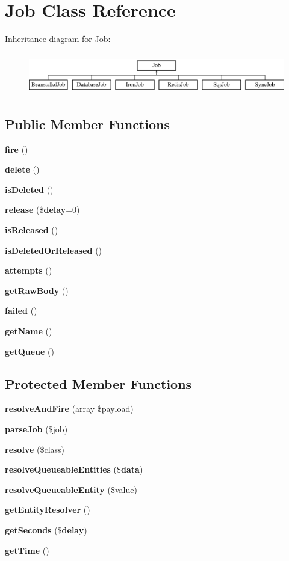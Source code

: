 \section{Job Class Reference}
\label{class_illuminate_1_1_queue_1_1_jobs_1_1_job}
Inheritance diagram for Job\+:\begin{figure}[H]
\begin{center}
\leavevmode
\includegraphics[height=1.830065cm]{class_illuminate_1_1_queue_1_1_jobs_1_1_job}
\end{center}
\end{figure}
\subsection*{Public Member Functions}
\begin{DoxyCompactItemize}
\item 
{\bf fire} ()
\item 
{\bf delete} ()
\item 
{\bf is\+Deleted} ()
\item 
{\bf release} (\${\bf delay}=0)
\item 
{\bf is\+Released} ()
\item 
{\bf is\+Deleted\+Or\+Released} ()
\item 
{\bf attempts} ()
\item 
{\bf get\+Raw\+Body} ()
\item 
{\bf failed} ()
\item 
{\bf get\+Name} ()
\item 
{\bf get\+Queue} ()
\end{DoxyCompactItemize}
\subsection*{Protected Member Functions}
\begin{DoxyCompactItemize}
\item 
{\bf resolve\+And\+Fire} (array \$payload)
\item 
{\bf parse\+Job} (\$job)
\item 
{\bf resolve} (\$class)
\item 
{\bf resolve\+Queueable\+Entities} (\${\bf data})
\item 
{\bf resolve\+Queueable\+Entity} (\$value)
\item 
{\bf get\+Entity\+Resolver} ()
\item 
{\bf get\+Seconds} (\${\bf delay})
\item 
{\bf get\+Time} ()
\end{DoxyCompactItemize}
